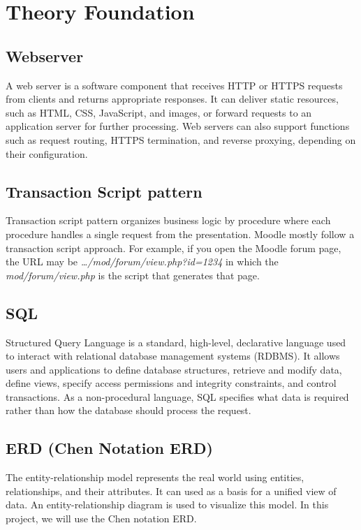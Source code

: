 \section{Theory Foundation}

\subsection{Webserver}
A web server is a software component that receives HTTP or HTTPS requests from clients and returns appropriate responses. It can deliver static resources, such as HTML, CSS, JavaScript, and images, or forward requests to an application server for further processing. Web servers can also support functions such as request routing, HTTPS termination, and reverse proxying, depending on their configuration.

\subsection{Transaction Script pattern}
Transaction script pattern organizes business logic by procedure where each procedure handles a single request from the presentation. Moodle mostly follow a transaction script approach. For example, if you open the Moodle forum page, the URL may be \textit{…/mod/forum/view.php?id=1234} in which the \textit{mod/forum/view.php} is the script that generates that page.

\subsection{SQL}
Structured Query Language is a standard, high-level, declarative language used to interact with relational database management systems (RDBMS). It allows users and applications to define database structures, retrieve and modify data, define views, specify access permissions and integrity constraints, and control transactions. As a non-procedural language, SQL specifies what data is required rather than how the database should process the request.

\subsection{ERD (Chen Notation ERD)}
The entity-relationship model represents the real world using entities, relationships, and their attributes. It can used as a basis for a unified view of data. An entity-relationship diagram is used to visualize this model. In this project, we will use the Chen notation ERD.

